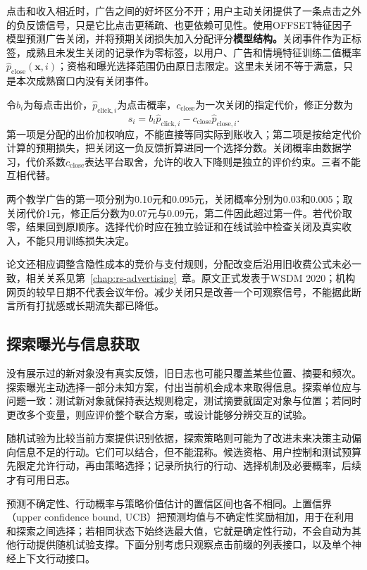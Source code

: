 点击和收入相近时，广告之间的好坏区分不开；用户主动关闭提供了一条点击之外的负反馈信号，只是它比点击更稀疏、也更依赖可见性。使用OFFSET特征因子模型预测广告关闭，并将预期关闭损失加入分配评分\textbf{模型结构。}关闭事件作为正标签，成熟且未发生关闭的记录作为零标签，以用户、广告和情境特征训练二值概率$\widehat p_{\mathrm{close}}(\bm x,i)$；资格和曝光选择范围仍由原日志限定。这里未关闭不等于满意，只是本次成熟窗口内没有关闭事件。

令$b_i$为每点击出价，$\widehat p_{\mathrm{click},i}$为点击概率，$c_{\mathrm{close}}$为一次关闭的指定代价，修正分数为
\begin{equation}
 s_i=b_i\widehat p_{\mathrm{click},i}
     -c_{\mathrm{close}}\widehat p_{\mathrm{close},i}.
 \label{eq:rs-ad-close}
\end{equation}
第一项是分配的出价加权响应，不能直接等同实际到账收入；第二项是按给定代价计算的预期损失，把关闭这一负反馈折算进同一个选择分数。关闭概率由数据学习，代价系数$c_{\mathrm{close}}$表达平台取舍，允许的收入下降则是独立的评价约束。三者不能互相代替。

两个教学广告的第一项分别为0.10元和0.095元，关闭概率分别为0.03和0.005；取关闭代价1元，修正后分数为0.07元与0.09元，第二件因此超过第一件。若代价取零，结果回到原顺序。选择代价时应在独立验证和在线试验中检查关闭及真实收入，不能只用训练损失决定。

论文还相应调整含隐性成本的竞价与支付规则，分配改变后沿用旧收费公式未必一致，相关关系见第~\ref{chap:rs-advertising}~章。原文正式发表于WSDM 2020；机构网页的较早日期不代表会议年份。减少关闭只是改善一个可观察信号，不能据此断言所有打扰感或长期流失都已降低。

\subsection{探索曝光与信息获取}
\label{sec:rs-exploration-exposure}

没有展示过的新对象没有真实反馈，旧日志也可能只覆盖某些位置、摘要和频次。探索曝光主动选择一部分未知方案，付出当前机会成本来取得信息。探索单位应与问题一致：测试新对象就保持表达规则稳定，测试摘要就固定对象与位置；若同时更改多个变量，则应评价整个联合方案，或设计能够分辨交互的试验。

随机试验为比较当前方案提供识别依据，探索策略则可能为了改进未来决策主动偏向信息不足的行动。它们可以结合，但不能混称。候选资格、用户控制和测试预算先限定允许行动，再由策略选择；记录所执行的行动、选择机制及必要概率，后续才有可用日志。

预测不确定性、行动概率与策略价值估计的置信区间也各不相同。上置信界（upper confidence bound, UCB）把预测均值与不确定性奖励相加，用于在利用和探索之间选择；若相同状态下始终选最大值，它就是确定性行动，不会自动为其他行动提供随机试验支撑。下面分别考虑只观察点击前缀的列表接口，以及单个神经上下文行动接口。

